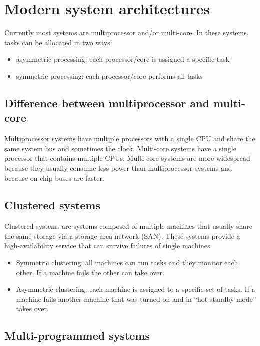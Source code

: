\section{Modern system architectures}

Currently most systems are multiprocessor and/or multi-core. In these systems, tasks can be allocated in two ways:
\begin{itemize}
  \item asymmetric processing: each processor/core is assigned a specific task
  \item symmetric processing: each processor/core performs all tasks
\end{itemize}

\subsection{Difference between multiprocessor and multi-core}

Multiprocessor systems have multiple processors with a single CPU and share the same system bus and sometimes the clock. Multi-core systems have a single processor that contains multiple CPUs. Multi-core systems are more widespread because they usually consume less power than multiprocessor systems and because on-chip buses are faster.


\subsection{Clustered systems}

Clustered systems are systems composed of multiple machines that usually share the same storage via a storage-area network (SAN). These systems provide a high-availability service that can survive failures of single machines.
\begin{itemize}
  \item Symmetric clustering: all machines can run tasks and they monitor each
  other. If a machine fails the other can take over.
  \item Asymmetric clustering: each machine is assigned to a specific set of
  tasks. If a machine fails another machine that was turned on and in
  ``hot-standby mode'' takes over.
\end{itemize}

\subsection{Multi-programmed systems}

